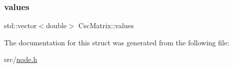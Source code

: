 \mbox{\label{structCscMatrix_ae540c6a54027394970614fe75f20d68a}} 
\subsubsection{\texorpdfstring{values}{values}}
{\footnotesize\ttfamily std\+::vector$<$double$>$ Csc\+Matrix\+::values}



The documentation for this struct was generated from the following file\+:\begin{DoxyCompactItemize}
\item 
src/\hyperlink{node_8h}{node.\+h}\end{DoxyCompactItemize}
